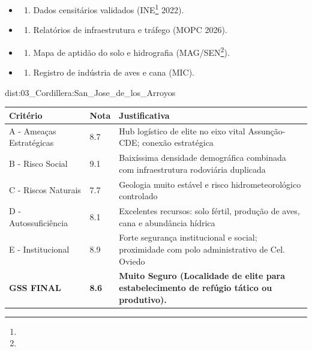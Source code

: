 {\begin{itemize}
\tightlist
\item
  \begin{enumerate}
  \def\labelenumi{\arabic{enumi})}
  \tightlist
  \item
    Dados censitários validados (INE\footnote{\fineINE} 2022).
  \end{enumerate}
\item
  \begin{enumerate}
  \def\labelenumi{\arabic{enumi})}
  \setcounter{enumi}{1}
  \tightlist
  \item
    Relatórios de infraestrutura e tráfego (MOPC 2026).
  \end{enumerate}
\item
  \begin{enumerate}
  \def\labelenumi{\arabic{enumi})}
  \setcounter{enumi}{2}
  \tightlist
  \item
    Mapa de aptidão do solo e hidrografia (MAG/\allowbreak SEN\footnote{\fineSEN}).
  \end{enumerate}
\item
  \begin{enumerate}
  \def\labelenumi{\arabic{enumi})}
  \setcounter{enumi}{3}
  \tightlist
  \item
    Registro de indústria de aves e cana (MIC).
  \end{enumerate}
\end{itemize}}{dist:03_Cordillera:San_Jose_de_los_Arroyos}
\begin{table}[ht!]
\small \begin{tabular}{p{3.0cm}p{0.8cm}p{6.0cm}} \toprule
\textbf{Critério} & \textbf{Nota} & \textbf{Justificativa} \\ \midrule
A - Ameaças Estratégicas & 8.7 & Hub logístico de elite no eixo vital Assunção-CDE; conexão estratégica \\
B - Risco Social & 9.1 & Baixíssima densidade demográfica combinada com infraestrutura rodoviária duplicada \\
C - Riscos Naturais & 7.7 & Geologia muito estável e risco hidrometeorológico controlado \\
D - Autossuficiência & 8.1 & Excelentes recursos: solo fértil, produção de aves, cana e abundância hídrica \\
E - Institucional & 8.9 & Forte segurança institucional e social; proximidade com polo administrativo de Cel. Oviedo \\
\midrule \textbf{GSS FINAL} & \textbf{8.6} & \textbf{Muito Seguro (Localidade de elite para estabelecimento de refúgio tático ou produtivo).} \\ \bottomrule \end{tabular}
\end{table}

